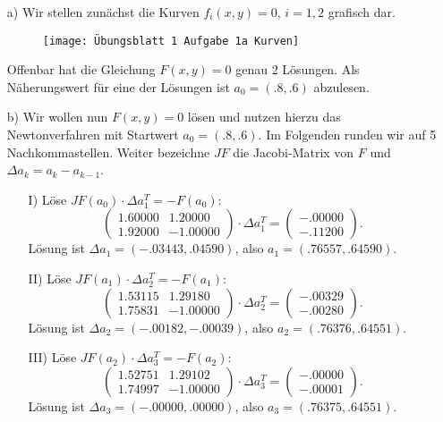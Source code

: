 \documentclass[11pt]{article}
\theoremstyle{plain}
\theoremstyle{definition}
\theoremstyle{remark}
\begin{document}
\begin{itemize} 
\item[a)] 
Wir stellen zunächst die Kurven $ f_i (x,y) = 0 $, $ i = 1,2 $ grafisch dar. 

\begin{figure}[h]
	\centering 
	\texttt{[image: Übungsblatt 1 Aufgabe 1a Kurven]}
\end{figure}

Offenbar hat die Gleichung $ F(x,y) = 0 $ genau 2 Lösungen. Als Näherungswert für eine der Lösungen ist $ a_0 = (.8,.6) $ abzulesen. 
\item[b)] 
Wir wollen nun $ F(x,y) = 0 $ lösen und nutzen hierzu das Newtonverfahren mit Startwert $ a_0 = (.8,.6) $. Im Folgenden runden wir auf 5 Nachkommastellen. Weiter bezeichne $ JF $ die Jacobi-Matrix von $ F $ und $ \Delta a_k = a_k - a_{k-1} $. 
\begin{itemize}
\item[I)] 
Löse $ JF(a_0) \cdot \Delta a_1^T = -F(a_0) $: 
\[ \begin{pmatrix}
	1.60000 & 1.20000 \\ 
	1.92000 & -1.00000
\end{pmatrix} \cdot \Delta a_1^T 
= \begin{pmatrix}
-.00000 \\ 
-.11200
\end{pmatrix}. \] 
Lösung ist $ \Delta a_1 = (-.03443, .04590) $, also $ a_1 = (.76557, .64590) $. 
\item[II)] 
Löse $ JF(a_1) \cdot \Delta a_2^T = -F(a_1) $: 
\[ \begin{pmatrix}
	1.53115 & 1.29180 \\ 
	1.75831 & -1.00000
\end{pmatrix} \cdot \Delta a_2^T 
= \begin{pmatrix}
-.00329 \\ 
-.00280
\end{pmatrix}. \] 
Lösung ist $ \Delta a_2 = (-.00182, -.00039) $, also $ a_2 = (.76376, .64551) $. 
\item[III)] 
Löse $ JF(a_2) \cdot \Delta a_3^T = -F(a_2) $: 
\[ \begin{pmatrix}
	1.52751 & 1.29102 \\ 
	1.74997 & -1.00000
\end{pmatrix} \cdot \Delta a_3^T 
= \begin{pmatrix}
-.00000 \\ 
-.00001
\end{pmatrix}. \] 
Lösung ist $ \Delta a_3 = (-.00000, .00000) $, also $ a_3 = (.76375, .64551) $. 
\end{itemize}
\end{itemize}
\end{document}
